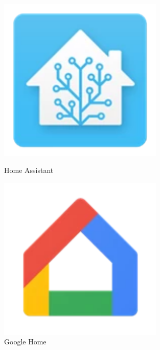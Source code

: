 \begin{figure}[ht!]
 	\centering
 	\begin{minipage}[t]{0.3\linewidth}
 		\centering
 		\includegraphics[width=0.7\textwidth]{img/home-assistant-io_logo.png}
 		\caption[Home Assistant Logo]{Home Assistant}
 		\label{fig:hassio-logo}
 	\end{minipage}
 	\hfill
 	\begin{minipage}[t]{0.3\linewidth}
 		\centering
 		\includegraphics[width=0.7\textwidth]{img/google-cast_logo.png}
 		\caption[Google Home Logo]{Google Home}
 		\label{fig:google-home-logo}
 	\end{minipage}
 	\hfill
 	\begin{minipage}[t]{0.3\linewidth}
 		\centering

\end{minipage}
\end{figure}
